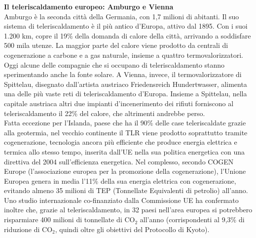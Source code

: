 \documentclass[laurea,oneside,11pt]{USiena_tesiLM3}
\begin{document}
\noindent\textbf{Il teleriscaldamento europeo: Amburgo e Vienna}\\
\noindent Amburgo è la seconda città della Germania, con 1,7 milioni di abitanti. Il suo sistema di teleriscaldamento è il più antico d'Europa, attivo dal 1895. Con i suoi 1.200 km, copre il 19\% della domanda di calore della città, arrivando a soddisfare 500 mila utenze. La maggior parte del calore viene prodotto da centrali di cogenerazione a carbone e a gas naturale, insieme a quattro termovalorizzatori. Oggi alcune delle compagnie che si occupano di teleriscaldamento stanno sperimentando anche la fonte solare.
A Vienna, invece, il termovalorizzatore di Spittelau, disegnato dall’artista austriaco Friedensreich Hundertwasser, alimenta una delle più vaste reti di teleriscaldamento d'Europa. Insieme a Spittelau, nella capitale austriaca altri due impianti d'incenerimento dei rifiuti forniscono al teleriscaldamento il 22\% del calore, che altrimenti andrebbe perso.\\


Fatta eccezione per l’Islanda, paese che ha il 90\% delle case teleriscaldate grazie alla geotermia, nel vecchio continente il TLR viene prodotto soprattutto tramite cogenerazione, tecnologia ancora più efficiente che produce energia elettrica e termica allo stesso tempo, inserita dall'UE nella sua politica energetica con una direttiva del 2004 sull'efficienza energetica.
Nel complesso, secondo COGEN Europe (l'associazione europea per la promozione della cogenerazione), l'Unione Europea genera in media l'11\% della sua energia elettrica con cogenerazione, evitando almeno 35 milioni di TEP (Tonnellate Equivalenti di petrolio) all'anno. Uno studio internazionale co-finanziato dalla Commissione UE ha confermato inoltre che, grazie al teleriscaldamento, in 32 paesi nell'area europea si potrebbero risparmiare 400 milioni di tonnellate di CO$_2$ all'anno (corrispondenti al 9,3\% di riduzione di CO$_2$, quindi oltre gli obiettivi del Protocollo di Kyoto).\\
\end{document}
